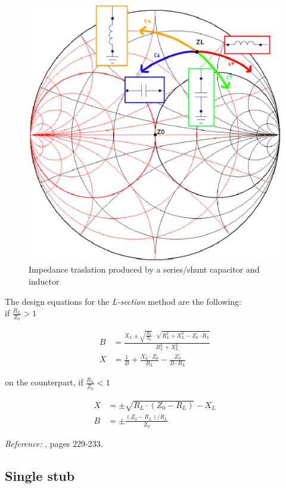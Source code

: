 \begin{figure}[H]
\centering
\includegraphics[width=120mm]{SmithChart-Lsection}
\caption{Impedance traslation produced by a series/shunt capacitor and inductor}
\label{fig:LsectionSmith}
\end{figure}


\noindent The design equations for the \textit{L-section} method are the following:\\

if $\frac{R_L}{Z_0} > 1$

\begin{align}
B & = \frac{X_L \pm \sqrt{\frac{R_L}{Z_0}} \cdot \sqrt{R_L^2 + X_L^2 - Z_0\cdot R_L}}{R_L^2 + X_L^2} \\
X & = \frac{1}{B} + \frac{X_L \cdot Z_0}{R_L} - \frac{Z_0}{B \cdot R_L}
\end{align}

\noindent on the counterpart, if $\frac{R_L}{Z_0} < 1$

\begin{align}
X & = \pm \sqrt{R_L \cdot (Z_0 - R_L)} - X_L \\
B & = \pm \frac{(Z_0 - R_L)/R_L}{Z_0}
\end{align}


\noindent \textit{Reference:} \cite{Pozar}, pages 229-233.

\subsection{Single stub}

